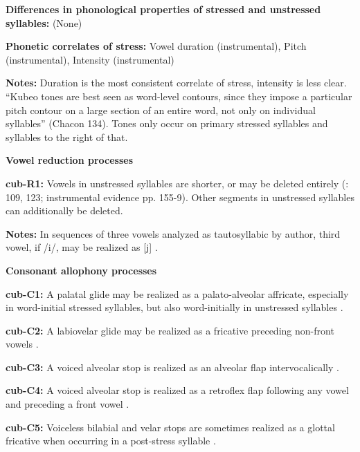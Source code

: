 \textbf{Differences in phonological properties of stressed and unstressed syllables:} (None)



\textbf{Phonetic correlates of stress:} Vowel duration (instrumental), Pitch (instrumental), Intensity (instrumental)



\textbf{Notes:} Duration is the most consistent correlate of stress, intensity is less clear. “Kubeo tones are best seen as word-level contours, since they impose a particular pitch contour on a large section of an entire word, not only on individual syllables'' (Chacon 134). Tones only occur on primary stressed syllables and syllables to the right of that.



\textbf{Vowel reduction processes}



\textbf{cub-R1:} Vowels in unstressed syllables are shorter, or may be deleted entirely (\citealt{Chacon2012}: 109, 123; instrumental evidence pp. 155-9). Other segments in unstressed syllables can additionally be deleted.



\textbf{Notes:} In sequences of three vowels analyzed as tautosyllabic by author, third vowel, if /i/, may be realized as [j] \citep[52]{Chacon2012}.



\textbf{Consonant allophony processes}



\textbf{cub-C1:} A palatal glide may be realized as a palato-alveolar affricate, especially in word-initial stressed syllables, but also word-initially in unstressed syllables \citep[67]{Chacon2012}.



\textbf{cub-C2:} A labiovelar glide may be realized as a fricative preceding non-front vowels \citep[63]{Chacon2012}.



\textbf{cub-C3:} A voiced alveolar stop is realized as an alveolar flap intervocalically \citep[63]{Chacon2012}.



\textbf{cub-C4:} A voiced alveolar stop is realized as a retroflex flap following any vowel and preceding a front vowel \citep[6]{Chacon2012}.



\textbf{cub-C5:} Voiceless bilabial and velar stops are sometimes realized as a glottal fricative when occurring in a post-stress syllable \citep[123]{Chacon2012}.



